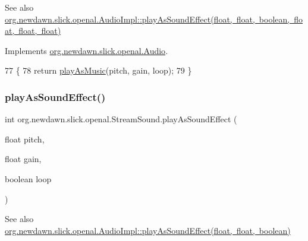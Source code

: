 \begin{DoxySeeAlso}{See also}
\mbox{\hyperlink{classorg_1_1newdawn_1_1slick_1_1openal_1_1_audio_impl_a400627f68fca6dfd837fcce2d8536527}{org.\+newdawn.\+slick.\+openal.\+Audio\+Impl\+::play\+As\+Sound\+Effect(float, float, boolean, float, float, float)}} 
\end{DoxySeeAlso}


Implements \mbox{\hyperlink{interfaceorg_1_1newdawn_1_1slick_1_1openal_1_1_audio_aebd22c97a1ed92528ad816e7152c7e00}{org.\+newdawn.\+slick.\+openal.\+Audio}}.


\begin{DoxyCode}
77                                                                                                    \{
78         \textcolor{keywordflow}{return} \mbox{\hyperlink{classorg_1_1newdawn_1_1slick_1_1openal_1_1_stream_sound_ac7efc7d8db3fe1f34edae365c7d226fe}{playAsMusic}}(pitch, gain, loop);
79     \}
\end{DoxyCode}
\mbox{\label{classorg_1_1newdawn_1_1slick_1_1openal_1_1_stream_sound_a5dd8c3584d4f80a2a73abf596adddf86}} 
\subsubsection{\texorpdfstring{play\+As\+Sound\+Effect()}{playAsSoundEffect()}\hspace{0.1cm}{\footnotesize\ttfamily [2/2]}}
{\footnotesize\ttfamily int org.\+newdawn.\+slick.\+openal.\+Stream\+Sound.\+play\+As\+Sound\+Effect (\begin{DoxyParamCaption}\item[{float}]{pitch,  }\item[{float}]{gain,  }\item[{boolean}]{loop }\end{DoxyParamCaption})\hspace{0.3cm}{\ttfamily [inline]}}

\begin{DoxySeeAlso}{See also}
\mbox{\hyperlink{classorg_1_1newdawn_1_1slick_1_1openal_1_1_audio_impl_a731e0f7331c13b1c6507303ab875c6da}{org.\+newdawn.\+slick.\+openal.\+Audio\+Impl\+::play\+As\+Sound\+Effect(float, float, boolean)}} 
\end{DoxySeeAlso}



